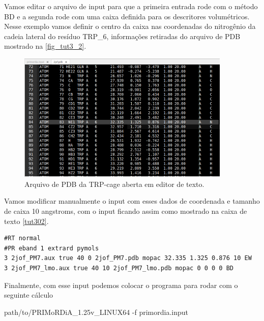 \documentclass[a4paper,11pt]{refart}
\begin{document}
Vamos editar o arquivo de input para que a primeira entrada rode com o método BD e a segunda rode com uma caixa definida para os descritores volumétricos. Nesse exemplo vamos definir o centro da caixa nas coordenadas do nitrogênio da cadeia lateral do resíduo TRP\_6, informações retiradas do arquivo de PDB mostrado na \autoref{fig_tut3_2}.

\hspace*{-\leftmarginwidth}
\begin{minipage}{\fullwidth}
\begin{figure}[H]
\begin{center}
\includegraphics[width=4in]{images/tut3_img3}
\caption{Arquivo de PDB da TRP-cage aberta em editor de texto.}
\label{fig_tut3_2}
\end{center}
\end{figure}
\end{minipage}

Vamos modificar manualmente o input com esses dados de coordenada e tamanho de caixa 10 angstroms, com o input ficando assim como mostrado na caixa de texto \autoref{tut302}.

\hspace*{-1\leftmarginwidth}
\begin{minipage}{\fullwidth}
\begin{lstlisting}[caption={Input editado para execução do tutorial 3},label={tut302}]
#RT normal 
#PR eband 1 extrard pymols 
3 2jof_PM7.aux true 40 0 2jof_PM7.pdb mopac 32.335 1.325 0.876 10 EW 
3 2jof_PM7_lmo.aux true 40 10 2jof_PM7_lmo.pdb mopac 0 0 0 0 BD	
\end{lstlisting}
\end{minipage}

Finalmente, com esse input podemos colocar o programa para rodar com o seguinte cálculo

\hspace*{-\leftmarginwidth}
\begin{minipage}{\fullwidth}
	\begin{commandshell}path/to/PRIMoRDiA_1.25v_LINUX64 -f primordia.input\end{commandshell}
\end{minipage}
\end{document}
